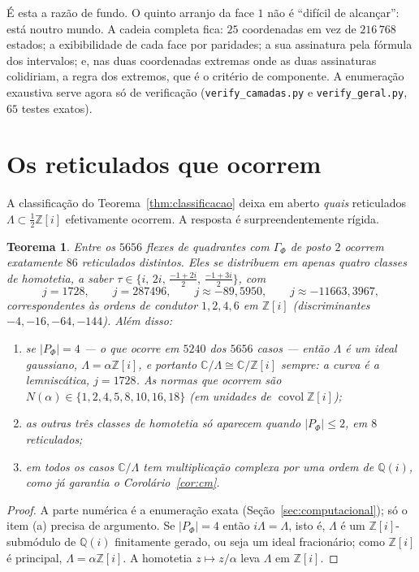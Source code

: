 \documentclass[11pt,a4paper]{article}
\theoremstyle{plain}
\newtheorem{teorema}{Teorema}[section]
\theoremstyle{definition}
\theoremstyle{remark}
\newcommand{\C}{\mathbb{C}}
\newcommand{\Z}{\mathbb{Z}}
\newcommand{\Q}{\mathbb{Q}}
\newcommand{\Zi}{\Z[i]}
\DeclareMathOperator{\covol}{covol}
\begin{document}
É esta a razão de fundo. O quinto arranjo da face $1$ não é ``difícil de
alcançar'': está noutro mundo. A cadeia completa fica: $25$ coordenadas em vez
de $216\,768$ estados; a exibibilidade de cada face por paridades; a sua
assinatura pela fórmula dos intervalos; e, nas duas coordenadas extremas onde
as duas assinaturas colidiriam, a regra dos extremos, que é o critério de
componente. A enumeração exaustiva serve agora só de verificação
(\texttt{verify\_camadas.py} e \texttt{verify\_geral.py}, $65$ testes exatos).


\section{Os reticulados que ocorrem}\label{sec:reticulados}

A classificação do Teorema~\ref{thm:classificacao} deixa em aberto \emph{quais}
reticulados $\Lambda\subset\frac12\Zi$ efetivamente ocorrem. A resposta é
surpreendentemente rígida.

\begin{teorema}\label{thm:reticulados}
Entre os $5656$ flexes de quadrantes com $\Gamma_\Phi$ de posto $2$ ocorrem
exatamente $86$ reticulados distintos. Eles se distribuem em apenas
\emph{quatro} classes de homotetia, a saber $\tau\in\{i,\,2i,\,\frac{-1+2i}2,\,
\frac{-1+3i}2\}$, com
\[
j=1728,\qquad j=287496,\qquad j\approx-89{,}5950,\qquad j\approx-11663{,}3967,
\]
correspondentes às ordens de condutor $1,2,4,6$ em $\Zi$ (discriminantes
$-4,-16,-64,-144$). Além disso:
\begin{enumerate}
\item[(a)] se $|P_\Phi|=4$ --- o que ocorre em $5240$ dos $5656$ casos --- então
$\Lambda$ é um ideal gaussiano, $\Lambda=\alpha\Zi$, e portanto
$\C/\Lambda\cong\C/\Zi$ \emph{sempre}: a curva é a lemniscática, $j=1728$. As
normas que ocorrem são
$N(\alpha)\in\{1,2,4,5,8,10,16,18\}$ (em unidades de $\covol\Zi$);
\item[(b)] as outras três classes de homotetia só aparecem quando
$|P_\Phi|\le2$, em $8$ reticulados;
\item[(c)] em todos os casos $\C/\Lambda$ tem multiplicação complexa por uma
ordem de $\Q(i)$, como já garantia o Corolário~\ref{cor:cm}.
\end{enumerate}
\end{teorema}

\begin{proof}
A parte numérica é a enumeração exata (Seção~\ref{sec:computacional}); só o
item (a) precisa de argumento. Se $|P_\Phi|=4$ então $i\Lambda=\Lambda$, isto
é, $\Lambda$ é um $\Zi$-submódulo de $\Q(i)$ finitamente gerado, ou seja um
ideal fracionário; como $\Zi$ é principal, $\Lambda=\alpha\Zi$. A homotetia
$z\mapsto z/\alpha$ leva $\Lambda$ em $\Zi$.
\end{proof}
\end{document}
